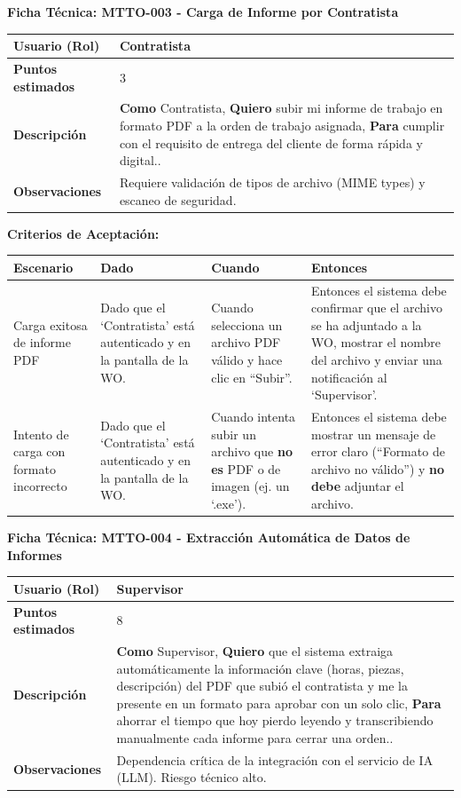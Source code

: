 \noindent
\textbf{Ficha Técnica: MTTO-003 - Carga de Informe por Contratista}
\footnotesize
\begin{longtable}{|p{}|p{}|}
\hline
\textbf{Usuario (Rol)} & Contratista \\ \hline
\textbf{Puntos estimados} & 3 \\ \hline
\textbf{Descripción} & \textbf{Como} Contratista, \textbf{Quiero} subir mi informe de trabajo en formato PDF a la orden de trabajo asignada, \textbf{Para} cumplir con el requisito de entrega del cliente de forma rápida y digital.. \\ \hline
\textbf{Observaciones} & Requiere validación de tipos de archivo (MIME types) y escaneo de seguridad. \\ \hline
\end{longtable}
\normalsize

\noindent
\textbf{Criterios de Aceptación:}
\footnotesize
\begin{longtable}{|p{}|p{}|p{}|p{}|}
\hline
\textbf{Escenario} & \textbf{Dado} & \textbf{Cuando} & \textbf{Entonces} \\ \hline
\endhead
Carga exitosa de informe PDF & Dado que el `Contratista' está autenticado y en la pantalla de la WO. & Cuando selecciona un archivo PDF válido y hace clic en ``Subir''. & Entonces el sistema debe confirmar que el archivo se ha adjuntado a la WO, mostrar el nombre del archivo y enviar una notificación al `Supervisor'. \\ \hline
Intento de carga con formato incorrecto & Dado que el `Contratista' está autenticado y en la pantalla de la WO. & Cuando intenta subir un archivo que \textbf{no es} PDF o de imagen (ej. un `.exe'). & Entonces el sistema debe mostrar un mensaje de error claro (``Formato de archivo no válido'') y \textbf{no debe} adjuntar el archivo. \\ \hline
\end{longtable}
\normalsize

\noindent
\textbf{Ficha Técnica: MTTO-004 - Extracción Automática de Datos de Informes}
\footnotesize
\begin{longtable}{|p{}|p{}|}
\hline
\textbf{Usuario (Rol)} & Supervisor \\ \hline
\textbf{Puntos estimados} & 8 \\ \hline
\textbf{Descripción} & \textbf{Como} Supervisor, \textbf{Quiero} que el sistema extraiga automáticamente la información clave (horas, piezas, descripción) del PDF que subió el contratista y me la presente en un formato para aprobar con un solo clic, \textbf{Para} ahorrar el tiempo que hoy pierdo leyendo y transcribiendo manualmente cada informe para cerrar una orden.. \\ \hline
\textbf{Observaciones} & Dependencia crítica de la integración con el servicio de IA (LLM). Riesgo técnico alto. \\ \hline
\end{longtable}
\normalsize

